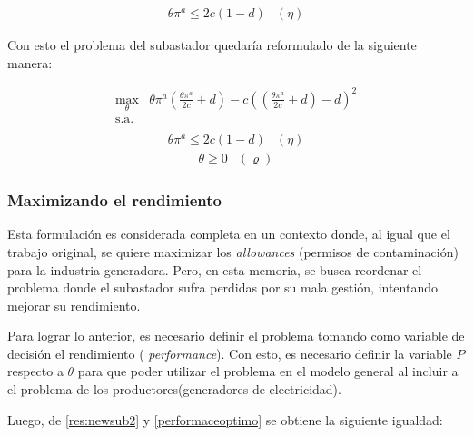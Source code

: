 \begin{equation}
\begin{array}{cl}
    \theta \pi^a\leq 2c(1-d) & (\eta) \label{res:newsub2}
\end{array}
\end{equation}

Con esto el problema del subastador quedaría reformulado de la siguiente manera:

\begin{equation}
\begin{array}{rrclcl}
    \displaystyle \max_{\theta} & \theta \pi^a(\frac{\theta \pi^a}{2c}+d) - c((\frac{\theta \pi^a}{2c}+d)-d)^2  \\\textrm{s.a.}\\
\end{array}
\end{equation}
\begin{equation}
\begin{array}{cl}
    \theta \pi^a\leq 2c(1-d) & (\eta) \label{res:newsub2}
\end{array}
\end{equation}
\begin{equation}
\begin{array}{cl}
    \theta \geq 0 & (\varrho)\label{res:newsub1}
\end{array}
\end{equation}

\subsubsection{Maximizando el rendimiento}

Esta formulación es considerada completa en un contexto donde, al igual que el trabajo original, se quiere maximizar los \textit{allowances} (permisos de contaminación) para la industria generadora. Pero, en esta memoria, se busca reordenar el problema donde el subastador sufra perdidas por su mala gestión, intentando mejorar su rendimiento.
\vspace{2.5mm}

Para lograr lo anterior, es necesario definir el problema tomando como variable de decisión el rendimiento ( \textit{performance}). Con esto, es necesario definir la variable $P$ respecto a $\theta$ para que poder utilizar el problema en el modelo general al incluir a el problema de los productores(generadores de electricidad).
\vspace{2.5mm}

Luego, de \ref{res:newsub2} y \ref{performaceoptimo} se obtiene la siguiente igualdad:


